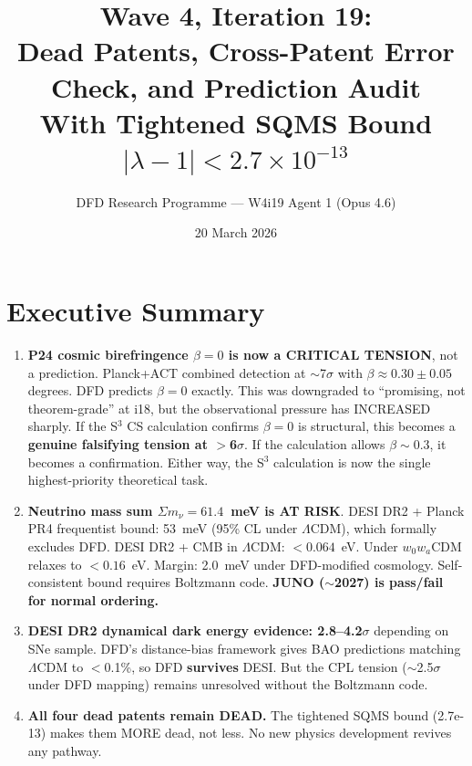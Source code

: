 \documentclass[11pt]{article}
\title{\textbf{Wave 4, Iteration 19:}\\
\textbf{Dead Patents, Cross-Patent Error Check, and Prediction Audit}\\[6pt]
{\large With Tightened SQMS Bound $|\lambda-1| < 2.7 \times 10^{-13}$}}
\author{DFD Research Programme --- W4i19 Agent 1 (Opus 4.6)}
\date{20 March 2026}
\begin{document}
\maketitle

\section*{Executive Summary}

\begin{tcolorbox}[colback=red!5!white, colframe=red!70!black,
  title=\textbf{HONEST NEGATIVES FIRST}]

\begin{enumerate}
\item \textbf{P24 cosmic birefringence $\beta=0$ is now a CRITICAL TENSION}, not a prediction.
  Planck+ACT combined detection at $\sim$7$\sigma$ with $\beta \approx 0.30 \pm 0.05$ degrees.
  DFD predicts $\beta = 0$ exactly. This was downgraded to ``promising, not theorem-grade''
  at i18, but the observational pressure has INCREASED sharply. If the S$^3$ CS calculation
  confirms $\beta=0$ is structural, this becomes a \textbf{genuine falsifying tension at
  $>$6$\sigma$}. If the calculation allows $\beta \sim 0.3$, it becomes a confirmation.
  Either way, the S$^3$ calculation is now the single highest-priority theoretical task.

\item \textbf{Neutrino mass sum $\Sigma m_\nu = 61.4$~meV is AT RISK}. DESI DR2 + Planck PR4
  frequentist bound: 53~meV (95\% CL under $\Lambda$CDM), which formally excludes DFD.
  DESI DR2 + CMB in $\Lambda$CDM: $< 0.064$~eV. Under $w_0w_a$CDM relaxes to $< 0.16$~eV.
  Margin: 2.0~meV under DFD-modified cosmology. Self-consistent bound requires Boltzmann code.
  \textbf{JUNO ($\sim$2027) is pass/fail for normal ordering.}

\item \textbf{DESI DR2 dynamical dark energy evidence: 2.8--4.2$\sigma$} depending on SNe sample.
  DFD's distance-bias framework gives BAO predictions matching $\Lambda$CDM to $<$0.1\%,
  so DFD \textbf{survives} DESI. But the CPL tension ($\sim$2.5$\sigma$ under DFD mapping)
  remains unresolved without the Boltzmann code.

\item \textbf{All four dead patents remain DEAD.} The tightened SQMS bound (2.7e-13) makes
  them MORE dead, not less. No new physics development revives any pathway.
\end{enumerate}
\end{tcolorbox}
\end{document}
